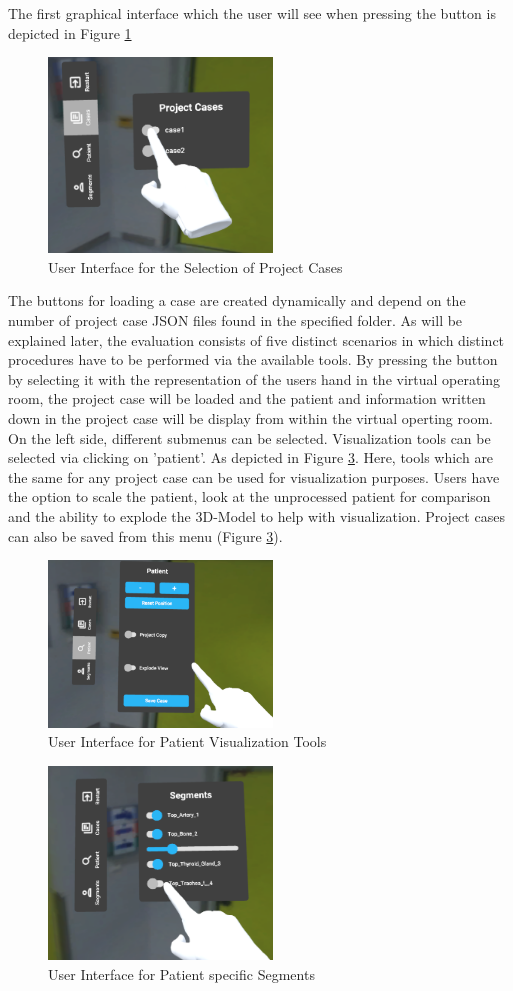 The first graphical interface which the user will see when pressing the button is depicted in Figure \ref{fig::UIProjectCase}
\begin{figure}[ht!]
    \centering
    \includegraphics[width=225px]{images/implementation/user_interface/project_cases.png}
    \caption{\label{fig::UIProjectCase}User Interface for the Selection of Project Cases}
\end{figure}
The buttons for loading a case are created dynamically and depend on the number of project case JSON files found in the specified folder.
As will be explained later, the evaluation consists of five distinct scenarios in which distinct procedures have to be performed via the available tools.
By pressing the button by selecting it with the representation of the users hand in the virtual operating room, the project case will be loaded and the patient and information written down in the project case will be display from within the virtual operting room.
On the left side, different submenus can be selected.
Visualization tools can be selected via clicking on 'patient'.
As depicted in Figure \ref{fig::UIPatient}.
Here, tools which are the same for any project case can be used for visualization purposes.
Users have the option to scale the patient, look at the unprocessed patient for comparison and the ability to explode the 3D-Model to help with visualization.
Project cases can also be saved from this menu (Figure \ref{fig::UIPatient}).

\begin{figure}[ht!]
    \centering
    \includegraphics[width=225px]{images/implementation/user_interface/patient.png}
    \caption{\label{fig::UIPatient}User Interface for Patient Visualization Tools}
\end{figure}

\begin{figure}[ht!]
    \centering
    \includegraphics[width=225px]{images/implementation/user_interface/segments.png}
    \caption{\label{fig::UIPatient}User Interface for Patient specific Segments}
\end{figure}
